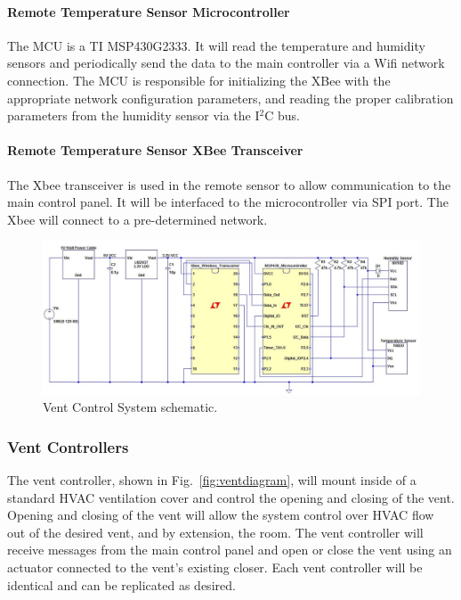 \paragraph{Remote Temperature Sensor Microcontroller}
The MCU is a TI MSP430G2333.  It will read the temperature and humidity sensors and periodically send the data to the main controller via a Wifi network connection.  The MCU is responsible for initializing the XBee with the appropriate network configuration parameters, and reading the proper calibration parameters from the humidity sensor via the I$^2$C bus.
\paragraph{Remote Temperature Sensor XBee Transceiver}
The Xbee transceiver is used in the remote sensor to allow communication to the main control panel. It will be interfaced to the microcontroller via SPI port.  The Xbee will connect to a pre-determined network.

\begin{figure} [htb]
\centering
\includegraphics[width=.99\textwidth]{Vent_System.JPG}
\caption{Vent Control System schematic.}
\label{fig:Vent_System}
\end{figure}

\subsubsection{Vent Controllers}
The vent controller, shown in Fig.~\ref{fig:ventdiagram}, will mount inside of a standard HVAC ventilation cover and control the opening and closing of the vent.  Opening and closing of the vent will allow the system control over HVAC flow out of the desired vent, and by extension, the room. The vent controller will receive messages from the main control panel and open or close the vent using an actuator connected to the vent's existing closer. Each vent controller will be identical and can be replicated as desired.
